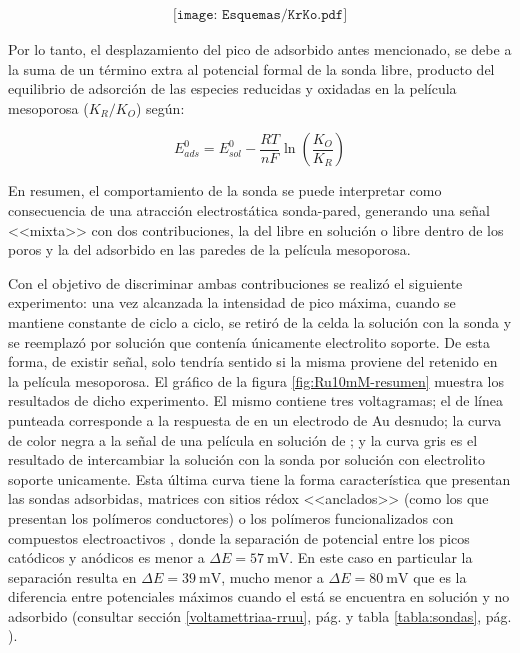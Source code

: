 				\begin{equation}
				\begin{aligned}
		 	    \texttt{[image: Esquemas/KrKo.pdf]}
		 	    \label{eq:ciclo}
		 	    \end{aligned}
		      	\end{equation}

		Por lo tanto, el desplazamiento del pico de \ru\space adsorbido antes mencionado, se debe a la suma de un término extra al potencial formal de la sonda libre, producto del equilibrio de adsorción de las especies reducidas y oxidadas en la película mesoporosa ($K_R/K_O$) según\cite{Wi2000}:

				\begin{equation}
				E^0_{ads} = E^0_{sol}-\frac{RT}{nF}\ln \left(\frac{K_O}{K_R}\right)
				\label{eq:kokreq}
				\end{equation}

		En resumen, el comportamiento de la sonda se puede interpretar como consecuencia de una atracción electrostática sonda-pared, generando una señal <<mixta>> con dos contribuciones, la del \ru\space libre en solución o libre dentro de los poros y la del \ru\space adsorbido en las paredes de la película mesoporosa.

		Con el objetivo de discriminar ambas contribuciones se realizó el siguiente experimento: una vez alcanzada la intensidad de pico máxima, cuando se mantiene constante de ciclo a ciclo, se retiró de la celda la solución con la sonda y se reemplazó por solución que contenía únicamente electrolito soporte. De esta forma, de existir señal, solo tendría sentido si la misma proviene del \ru\space retenido en la película mesoporosa. El gráfico de la figura \ref{fig:Ru10mM-resumen} muestra los resultados de dicho experimento. El mismo contiene tres voltagramas; el de línea punteada corresponde a la respuesta de \ru\space en un electrodo de Au desnudo; la curva de color negra a la señal de una película en solución de \ru; y la curva gris es el resultado de intercambiar la solución con la sonda por solución con electrolito soporte unicamente. Esta última curva tiene la forma característica que presentan las sondas adsorbidas, matrices con sitios rédox <<anclados>>\cite{ybarra2005,ybarra2007} (como los que presentan los polímeros conductores) o los polímeros funcionalizados con compuestos electroactivos \cite{Rohlfing2005,Vila2015}, donde la separación de potencial entre los picos catódicos y anódicos es menor a $\Delta E = \SI{57}{\milli\volt}$. En este caso en particular la separación resulta en $\Delta E = \SI{39}{\milli\volt}$, mucho menor a $\Delta E = \SI{80}{\milli\volt}$ que es la diferencia entre potenciales máximos cuando el \ru\space está se encuentra en solución y no adsorbido (consultar sección \ref{voltamettriaa-rruu}, pág. \pageref{voltamettriaa-rruu} y tabla \ref{tabla:sondas}, pág. \pageref{tabla:sondas})\cite{Wi2000}.

